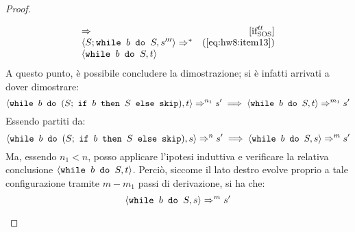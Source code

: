 \begin{proof}
\begin{itemize}
$$\begin{array}{lr}
      \Rightarrow^{ } &  [ \textrm{\normalfont{if}} ^ \textrm{\normalfont{\ensuremath{\mbox{\textit{tt}}}}} _\textrm{\normalfont{SOS}} ] \\
  \langle{}S;\mbox{\normalfont{\texttt{while }}} b \textrm{\normalfont{\texttt{ do }}} S, s'''\rangle{} \Rightarrow^{*} & (\text{\ref{eq:hw8:item13}}) \\
  \langle{}\mbox{\normalfont{\texttt{while }}} b \textrm{\normalfont{\texttt{ do }}} S, t\rangle{}
  \end{array}
  $$
  A questo punto, è possibile concludere la dimostrazione; si è infatti
  arrivati a dover dimostrare:
  $$
  \confSs{\wbS{b}{(S;\ \ifABC{b}{S}{\skipForFriends})}}{t} \Rar{n_1} s'
  \implies
  \confSs{\wbS{b}{S}}{t} \Rar{m_1} s'
  $$
  Essendo partiti da:
  $$
  \confSs{\wbS{b}{(S;\ \ifABC{b}{S}{\skipForFriends})}}{s} \Rar{n} s'
  \implies
  \confSs{\wbS{b}{S}}{s} \Rar{m} s'
  $$
  Ma, essendo $n_1 < n$, posso applicare l'ipotesi induttiva e verificare la
  relativa conclusione $\langle{}\mbox{\normalfont{\texttt{while }}} b \textrm{\normalfont{\texttt{ do }}} S, t\rangle{}$. Perciò, siccome
  il lato destro evolve proprio a tale configurazione tramite $m - m_1$ passi
  di derivazione, si ha che:
  $$
  \langle{}\mbox{\normalfont{\texttt{while }}} b \textrm{\normalfont{\texttt{ do }}} S, s\rangle{} \Rightarrow^{m} s'
  $$
\end{itemize}

\end{proof}
